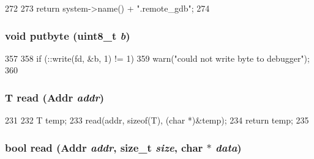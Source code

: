 \begin{DoxyCode}
272 {
273     return system->name() + ".remote_gdb";
274 }
\end{DoxyCode}
\hypertarget{classBaseRemoteGDB_af81af327543d8feab2b0bcc83170d68c}{
\subsubsection[{putbyte}]{\setlength{\rightskip}{0pt plus 5cm}void putbyte (uint8\_\-t {\em b})}}
\label{classBaseRemoteGDB_af81af327543d8feab2b0bcc83170d68c}



\begin{DoxyCode}
357 {
358     if (::write(fd, &b, 1) != 1)
359         warn("could not write byte to debugger");
360 }
\end{DoxyCode}
\hypertarget{classBaseRemoteGDB_a3bfd45e5030624d2d72405e15a25d961}{
\subsubsection[{read}]{\setlength{\rightskip}{0pt plus 5cm}T read ({\bf Addr} {\em addr})}}
\label{classBaseRemoteGDB_a3bfd45e5030624d2d72405e15a25d961}



\begin{DoxyCode}
231 {
232     T temp;
233     read(addr, sizeof(T), (char *)&temp);
234     return temp;
235 }
\end{DoxyCode}
\hypertarget{classBaseRemoteGDB_a08b012fff4ed4c4cd0f91b482551c75c}{
\subsubsection[{read}]{\setlength{\rightskip}{0pt plus 5cm}bool read ({\bf Addr} {\em addr}, \/  size\_\-t {\em size}, \/  char $\ast$ {\em data})}}
\label{classBaseRemoteGDB_a08b012fff4ed4c4cd0f91b482551c75c}



